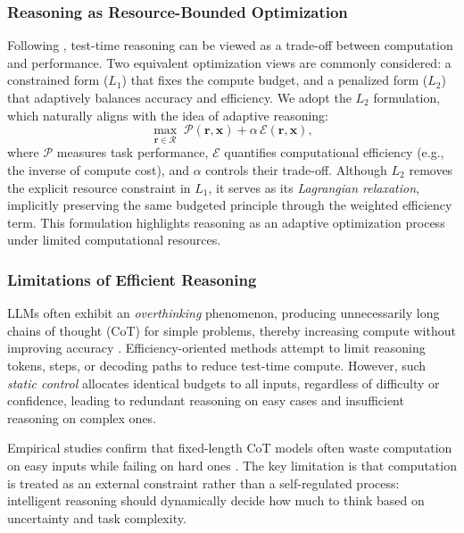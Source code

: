 \documentclass[11pt]{article}
\begin{document}
\subsubsection{Reasoning as Resource-Bounded Optimization}
\label{optimize}
Following \citet{alomrani2025reasoningbudgetsurveyadaptive}, 
test-time reasoning can be viewed as a trade-off between computation and performance. 
Two equivalent optimization views are commonly considered: 
a constrained form ($L_1$) that fixes the compute budget, 
and a penalized form ($L_2$) that adaptively balances accuracy and efficiency. 
We adopt the $L_2$ formulation, which naturally aligns with the idea of adaptive reasoning:
\begin{equation}
\max_{\mathbf{r}\in\mathcal{R}}\;
\mathcal{P}(\mathbf{r}, \mathbf{x})
+ \alpha\,\mathcal{E}(\mathbf{r}, \mathbf{x}),
\end{equation}
where $\mathcal{P}$ measures task performance, 
$\mathcal{E}$ quantifies computational efficiency 
(e.g., the inverse of compute cost), 
and $\alpha$ controls their trade-off. 
Although $L_2$ removes the explicit resource constraint in $L_1$, 
it serves as its \emph{Lagrangian relaxation}, 
implicitly preserving the same budgeted principle through the weighted efficiency term. 
This formulation highlights reasoning as an adaptive optimization process 
under limited computational resources.





\subsubsection{Limitations of Efficient Reasoning}


\label{sec:limitations-efficiency}
LLMs often exhibit an \emph{overthinking} phenomenon, producing unnecessarily long chains of thought (CoT) for simple problems, thereby increasing compute without improving accuracy
\citep{Sui2025StopOverthinking,alomrani2025reasoningbudgetsurveyadaptive}.
Efficiency-oriented methods attempt to limit reasoning tokens, steps, or decoding paths to reduce test-time compute. 
However, such \textit{static control} allocates identical budgets to all inputs, regardless of difficulty or confidence, 
leading to redundant reasoning on easy cases and insufficient reasoning on complex ones.

Empirical studies confirm that fixed-length CoT models often waste computation on easy inputs while failing on hard ones \citep{Sui2025StopOverthinking}. 
The key limitation is that computation is treated as an external constraint rather than a self-regulated process: 
intelligent reasoning should dynamically decide how much to think based on uncertainty and task complexity.
\end{document}
